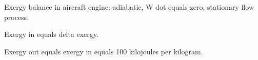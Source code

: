 Exergy balance in aircraft engine: adiabatic, W dot equals zero, stationary flow process.

Exergy in equals delta exergy.

Exergy out equals exergy in equals 100 kilojoules per kilogram.